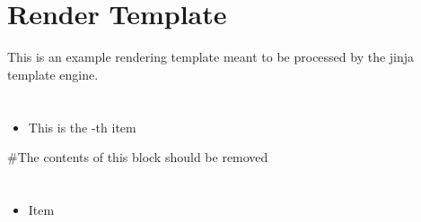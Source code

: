 \documentclass{article}
\begin{document}
    \section{Render Template}
    This is an example rendering template meant to be processed by the jinja template engine.

    \section{}
    \begin{itemize}
        \item This is the -th item

    \end{itemize}

    \#{The contents of this block should be removed}

    \section{}
    \begin{itemize}
        \item Item 
    \end{itemize}
\end{document}
